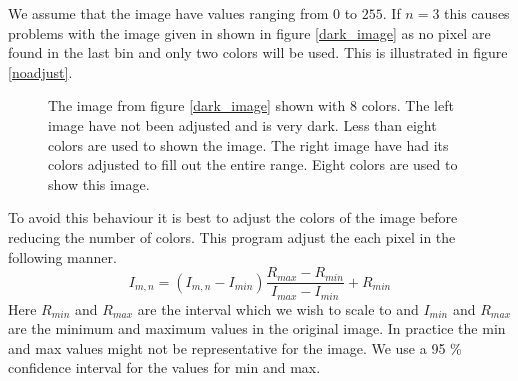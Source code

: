 \documentclass[a4paper, 10pt, final]{article}
\begin{document}
We assume that the image have values ranging from $0$ to $255$. If
$n=3$ this causes problems with the image given in shown in figure
\ref{dark_image} as no pixel are found in the last bin and only two
colors will be used. This is illustrated in figure \ref{noadjust}.

\begin{figure}[!h]
    \centering
    \caption[]{The image from figure \ref{dark_image} shown with 8
    colors. The left image have not been adjusted and is very dark.
    Less than eight colors are used to shown the image. The right image
    have had its colors adjusted to fill out the entire range. Eight
    colors are used to show this image.}
    \label{n8}
\end{figure}

To avoid this behaviour it is best to adjust the colors of the image
before reducing the number of colors. This program adjust the each pixel
in the following manner.
\begin{equation*}
    I_{m, n} =  (I_{m, n} - I_{min})\frac{R_{max} - R_{min}}{I_{max} - I_{min}} + R_{min}
\end{equation*}
Here $R_{min}$ and $R_{max}$ are the interval which we wish to scale to
and $I_{min}$ and $R_{max}$ are the minimum and maximum values in the
original image. In practice the min and max values might not be
representative for the image. We use a 95 \% confidence interval for the
values for min and max.
\end{document}
